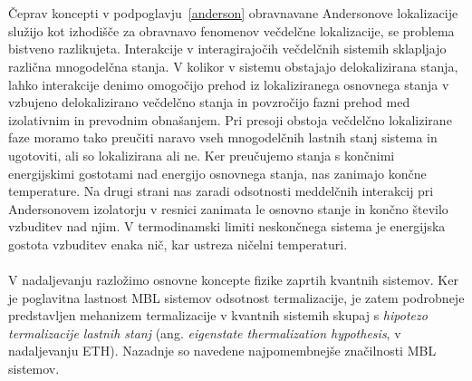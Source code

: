 \documentclass[10pt,a4paper]{article}
\begin{document}
\\\\ 
Čeprav koncepti v podpoglavju~\ref{anderson} obravnavane Andersonove lokalizacije služijo kot izhodišče za obravnavo fenomenov večdelčne lokalizacije, se problema bistveno razlikujeta. Interakcije v interagirajočih večdelčnih sistemih sklapljajo različna mnogodelčna stanja. V kolikor v sistemu obstajajo delokalizirana stanja, lahko interakcije denimo omogočijo prehod iz lokaliziranega osnovnega stanja v vzbujeno delokalizirano večdelčno stanja in povzročijo fazni prehod med izolativnim in prevodnim obnašanjem. Pri presoji obstoja večdelčno lokalizirane faze moramo tako preučiti naravo vseh mnogodelčnih lastnih stanj sistema in ugotoviti, ali so lokalizirana ali ne. Ker preučujemo stanja s končnimi energijskimi gostotami nad energijo osnovnega stanja, nas zanimajo končne temperature. Na drugi strani nas zaradi odsotnosti meddelčnih interakcij pri Andersonovem izolatorju v resnici zanimata le osnovno stanje in končno število vzbuditev nad njim. V termodinamski limiti neskončnega sistema je energijska gostota vzbuditev enaka nič, kar ustreza ničelni temperaturi. 
\\\\
V nadaljevanju razložimo osnovne koncepte fizike zaprtih kvantnih sistemov. Ker je poglavitna lastnost MBL sistemov odsotnost termalizacije, je zatem podrobneje predstavljen mehanizem termalizacije v kvantnih sistemih skupaj s \emph{hipotezo termalizacije lastnih stanj} (ang. \emph{eigenstate thermalization hypothesis}, v nadaljevanju ETH). Nazadnje so navedene najpomembnejše značilnosti MBL sistemov. 
\end{document}
